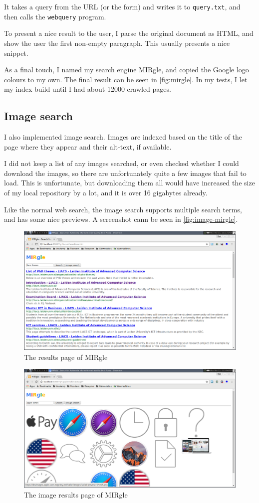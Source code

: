 \documentclass[12pt,a4paper]{article}
\begin{document}
It takes a query from the URL (or the form) and writes it to \texttt{query.txt}, and then calls the \texttt{webquery} program.

To present a nice result to the user, I parse the original document as HTML, and show the user the first non-empty paragraph. This usually presents a nice snippet.

As a final touch, I named my search engine MIRgle, and copied the Google logo colours to my own. The final result can be seen in \autoref{fig:mirgle}. In my tests, I let my index build until I had about 12000 crawled pages.

\subsection{Image search}
I also implemented image search. Images are indexed based on the title of the page where they appear and their alt-text, if available.

I did not keep a list of any images searched, or even checked whether I could download the images, so there are unfortunately quite a few images that fail to load. This is unfortunate, but downloading them all would have increased the size of my local repository by a lot, and it is over 16 gigabytes already.

Like the normal web search, the image search supports multiple search terms, and has some nice previews. A screenshot cann be seen in \autoref{fig:image-mirgle}.

\begin{figure}
\includegraphics[width=\textwidth]{screenshot}
\caption{The results page of MIRgle}
\label{fig:mirgle}
\end{figure}

\begin{figure}
    \includegraphics[width=\textwidth]{screenshot-img}
    \caption{The image results page of MIRgle}
    \label{fig:image-mirgle}
\end{figure}
\end{document}
